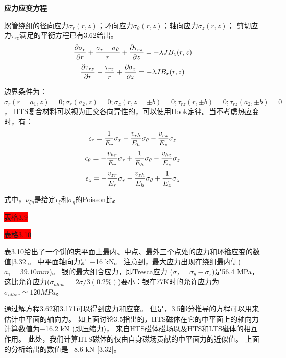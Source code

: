 \textbf{应力应变方程}

螺管绕组的径向应力$\sigma_r(r, z)$；环向应力$\sigma_\theta(r, z)$；轴向应力$\sigma_z(r, z)$；
剪切应力$\tau_{rz}$满足的平衡方程已有3.62给出。
\begin{equation}
\frac{\partial\sigma_{r}}{\partial r}+\frac{\sigma_{r}-\sigma_{\theta}}{r}+\frac{\partial\tau_{rz}}{\partial z}=-\lambda JB_{z}(r,z)\\%
\end{equation}
\begin{equation}
\frac{\partial\tau_{rz}}{\partial r}-\frac{\tau_{rz}}{r}+\frac{\partial\sigma_{z}}{\partial z}=-\lambda JB_{r}(r,z)\\%
\end{equation}

边界条件为：$\sigma_r(r = a_1, z) = 0; \sigma_r(a_2, z) = 0; \sigma_z(r, z = \pm b) = 0;
\tau_{rz}(r, \pm b)=0; \tau_{rz}(a_2,\pm b)=0$，
HTS复合材料可以视为正交各向异性的，可以使用Hook定律。当不考虑热应变时，有：
\begin{equation}
\epsilon_{r}=\frac{1}{E_{r}}\sigma_{r}-\frac{v_{rh}}{E_{h}}\sigma_{\theta}-\frac{v_{rz}}{E_{z}}\sigma_{z}\\%
\end{equation}
\begin{equation}
\epsilon_{\theta}=-\frac{v_{hr}}{E_{r}}\sigma_{r}+\frac{1}{E_{h}}\sigma_{\theta}-\frac{v_{hz}}{E_{z}}\sigma_{z}\\%
\end{equation}
\begin{equation}
\epsilon_{z}=-\frac{v_{zr}}{E_{r}}\sigma_{r}-\frac{v_{zh}}{E_{h}}\sigma_{\theta}+\frac{1}{E_{z}}\sigma_{z}\\%
\end{equation}

式中，$\nu_{\xi\eta}$是给定$\epsilon_\xi$和$\sigma_\eta$的Poisson比。

\colorbox{red}{表格3.9}

\colorbox{red}{表格3.10}

表3.10给出了一个饼的忠平面上最内、中点、最外三个点处的应力和环箍应变的数值[3.32]。
中平面轴向力是 −16 kN。
注意到，最大应力出现在绕组最内侧($a_1 =39.10 mm$)。
银的最大组合应力，即Tresca应力 ($\sigma_T= \sigma_{\theta} −\sigma_z$)是56.4 MPa，
这比允许应力($\sigma_{allow}=2\sigma/3(0.2\%)$)要小：银在77K时的允许应力为$\sigma_{allow}\simeq 120 MPa$。

通过解方程3.62和3.171可以得到应力和应变。
但是，3.5部分推导的方程可以用来估计中平面的轴向力。
如上面讨论3.5指出的，HTS磁体在它的中平面上的轴向力计算数值为−16.2 kN (即压缩力)，
来自HTS磁体磁场以及HTS和LTS磁体的相互作用。
此处，我们计算HTS磁体的仅由自身磁场贡献的中平面力的近似值。
上面的分析给出的数值是−8.6 kN [3.32]。

